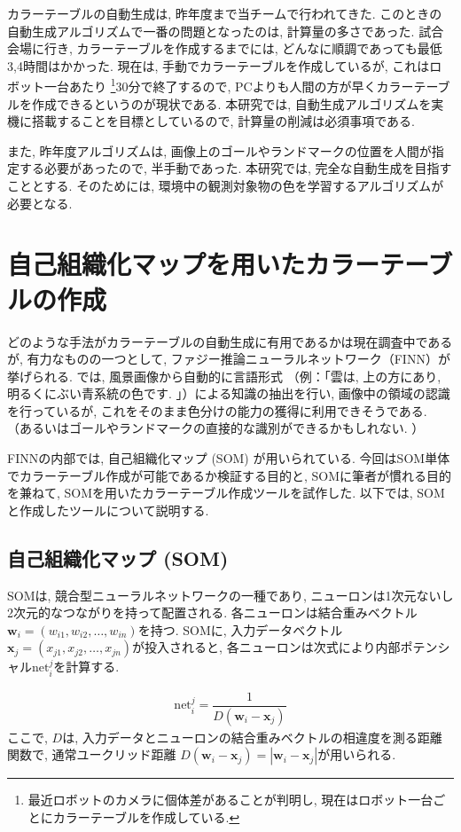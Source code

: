 \documentclass[a4paper,11pt]{jarticle}
\begin{document}
カラーテーブルの自動生成は, 昨年度まで当チームで行われてきた. 
このときの自動生成アルゴリズムで一番の問題となったのは,
計算量の多さであった. 
試合会場に行き, カラーテーブルを作成するまでには,
どんなに順調であっても最低3,4時間はかかった. 
現在は, 手動でカラーテーブルを作成しているが,
これはロボット一台あたり
\footnote{最近ロボットのカメラに個体差があることが判明し,
現在はロボット一台ごとにカラーテーブルを作成している. 
}30分で終了するので,
PCよりも人間の方が早くカラーテーブルを作成できるというのが現状である. 
本研究では, 自動生成アルゴリズムを実機に搭載することを目標としているので,
計算量の削減は必須事項である. 


また, 昨年度アルゴリズムは,
画像上のゴールやランドマークの位置を人間が指定する必要があったので,
半手動であった. 
本研究では, 完全な自動生成を目指すこととする. 
そのためには, 環境中の観測対象物の色を学習するアルゴリズムが必要となる. 


\section{自己組織化マップを用いたカラーテーブルの作成}
どのような手法がカラーテーブルの自動生成に有用であるかは現在調査中であるが,
有力なものの一つとして,
ファジー推論ニューラルネットワーク（FINN）\cite{iyatomi}が挙げられる. 
\cite{iyatomi}では, 風景画像から自動的に言語形式
（例：「雲は, 上の方にあり, 明るくにぶい青系統の色です. 
」）による知識の抽出を行い, 画像中の領域の認識を行っているが,
これをそのまま色分けの能力の獲得に利用できそうである. 
（あるいはゴールやランドマークの直接的な識別ができるかもしれない. ）

FINNの内部では, 自己組織化マップ (SOM) \cite{kohonen,usui}が用いられている. 
今回はSOM単体でカラーテーブル作成が可能であるか検証する目的と, 
SOMに筆者が慣れる目的を兼ねて, SOMを用いたカラーテーブル作成ツールを試作した. 
以下では, SOMと作成したツールについて説明する. 


\subsection{自己組織化マップ (SOM)}
SOMは, 競合型ニューラルネットワークの一種であり, 
ニューロンは1次元ないし2次元的なつながりを持って配置される. 
各ニューロンは結合重みベクトル
$\boldsymbol{w}_i = (w_{i1},w_{i2},\ldots ,w_{in})$を持つ. 
SOMに, 入力データベクトル
$\boldsymbol{x}_j = (x_{j1},x_{j2},\ldots ,x_{jn})$が投入されると,
各ニューロンは次式により内部ポテンシャル$\text{net}_i^j$を計算する. 

\begin{eqnarray}
\text{net}_i^j = \dfrac{1}{D(\boldsymbol{w}_i - \boldsymbol{x}_j)}
\end{eqnarray}
ここで, $D$は, 
入力データとニューロンの結合重みベクトルの相違度を測る距離関数で,
通常ユークリッド距離
$D(\boldsymbol{w}_i - \boldsymbol{x}_j) = |\boldsymbol{w}_i - \boldsymbol{x}_j|$が用いられる. 
\end{document}
